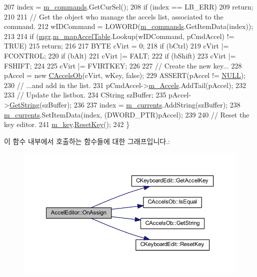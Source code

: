 \begin{DoxyCode}
207   index = \mbox{\hyperlink{class_accel_editor_aba4ea3d3eced08de9fe39e307b5f40fc}{m\_commands}}.GetCurSel();
208   \textcolor{keywordflow}{if} (index == LB\_ERR)
209     \textcolor{keywordflow}{return};
210 
211   \textcolor{comment}{// Get the object who manage the accels list, associated to the command.}
212   wIDCommand = LOWORD(\mbox{\hyperlink{class_accel_editor_aba4ea3d3eced08de9fe39e307b5f40fc}{m\_commands}}.GetItemData(index));
213 
214   \textcolor{keywordflow}{if} (\mbox{\hyperlink{class_accel_editor_acb731e2193cb5022a95e83122651f96d}{mgr}}.\mbox{\hyperlink{class_c_accelerator_manager_a16b8d3e9328bc0eeeb048630deff2768}{m\_mapAccelTable}}.Lookup(wIDCommand, pCmdAccel) != TRUE)
215     \textcolor{keywordflow}{return};
216 
217   BYTE cVirt = 0;
218   \textcolor{keywordflow}{if} (bCtrl)
219     cVirt |= FCONTROL;
220   \textcolor{keywordflow}{if} (bAlt)
221     cVirt |= FALT;
222   \textcolor{keywordflow}{if} (bShift)
223     cVirt |= FSHIFT;
224 
225   cVirt |= FVIRTKEY;
226 
227   \textcolor{comment}{// Create the new key...}
228   pAccel = \textcolor{keyword}{new} \mbox{\hyperlink{class_c_accels_ob}{CAccelsOb}}(cVirt, wKey, \textcolor{keyword}{false});
229   ASSERT(pAccel != \mbox{\hyperlink{getopt1_8c_a070d2ce7b6bb7e5c05602aa8c308d0c4}{NULL}});
230   \textcolor{comment}{// ...and add in the list.}
231   pCmdAccel->\mbox{\hyperlink{class_c_cmd_accel_ob_a85772f1ea9204af42b8a39a0135dc0f8}{m\_Accels}}.AddTail(pAccel);
232 
233   \textcolor{comment}{// Update the listbox.}
234   CString szBuffer;
235   pAccel->\mbox{\hyperlink{class_c_accels_ob_afaf7510fa1e0707863f6bd469f190de6}{GetString}}(szBuffer);
236 
237   index = \mbox{\hyperlink{class_accel_editor_a31909da8a929ef7b5e22ffbf64f1c68c}{m\_currents}}.AddString(szBuffer);
238   \mbox{\hyperlink{class_accel_editor_a31909da8a929ef7b5e22ffbf64f1c68c}{m\_currents}}.SetItemData(index, (DWORD\_PTR)pAccel);
239 
240   \textcolor{comment}{// Reset the key editor.}
241   \mbox{\hyperlink{class_accel_editor_af0875f914fdddf5233a951cabd499a4d}{m\_key}}.\mbox{\hyperlink{class_c_keyboard_edit_ad0185cc0cad77250cc32ef1d9ffb8593}{ResetKey}}();
242 \}
\end{DoxyCode}
이 함수 내부에서 호출하는 함수들에 대한 그래프입니다.\+:
\nopagebreak
\begin{figure}[H]
\begin{center}
\leavevmode
\includegraphics[width=350pt]{class_accel_editor_ad33ae69dcc262dd73595cb33d82c209e_cgraph}
\end{center}
\end{figure}
